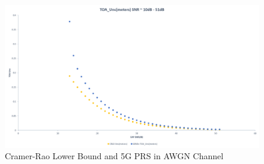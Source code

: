 \documentclass{article}
\begin{document}
\begin{figure}[h]
\caption{Cramer-Rao Lower Bound and 5G PRS in AWGN Channel}
\centering
\includegraphics[scale=0.5]{CRLB_toa}
\end{figure}
\end{document}
